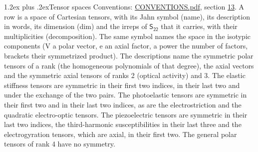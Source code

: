 \documentclass[10pt,a4paper]{article}
\makeatletter
\renewcommand\section{\@startsection{section}{1}{\z@}{-3ex plus -1ex minus -.2ex}%
  {1.2ex plus .2ex}{\normalfont\large\sffamily\bfseries\color{parttitle}}}
\numberwithin{equation}{section}
\newcommand{\grp}[1]{\mathsf{#1}}
\makeatother
\begin{document}
\section{Tensor spaces}\label{s:tensor_spaces}
Conventions: \href{../../CONVENTIONS.pdf}{CONVENTIONS.pdf}, section \href{../../CONVENTIONS.pdf\#conv.13}{13}.
\leavevmode\label{n:head.name}\label{n:head.description}\label{n:head.dim}\label{n:head.decomposition}A row is a space of Cartesian tensors, with its Jahn symbol (name), its description in words, its dimension (dim) and the irreps of $\grp{S_{22}}$ that it carries, with their multiplicities (decomposition). \label{n:label.jahn}The same symbol names the space in the isotypic components (V a polar vector, e an axial factor, a power the number of factors, brackets their symmetrized product). The descriptions name the symmetric polar tensors of a rank (the homogeneous polynomials of that degree), the axial vectors and the symmetric axial tensors of ranks 2 (optical activity) and 3. The elastic stiffness tensors are symmetric in their first two indices, in their last two and under the exchange of the two pairs. The photoelastic tensors are symmetric in their first two and in their last two indices, as are the electrostriction and the quadratic electro-optic tensors. The piezoelectric tensors are symmetric in their last two indices, the third-harmonic susceptibilities in their last three and the electrogyration tensors, which are axial, in their first two. The general polar tensors of rank 4 have no symmetry.
\end{document}

